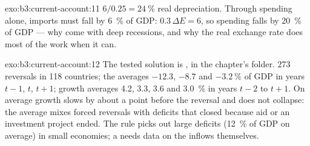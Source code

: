 \begin{solution}{exo:b3:current-account:11}
$6/0.25 = 24~\%$ real depreciation. Through spending alone, imports must fall by 6~\% of
GDP: $0.3\,\Delta E = 6$, so spending falls by 20~\% of GDP --- why  come
with deep recessions, and why the real exchange rate does most of the work when it
can.
\end{solution}

\begin{solution}{exo:b3:current-account:12}
The tested solution is , in the chapter's 
folder. 273 reversals in 118 countries; the  averages $-12.3$, $-8.7$
and $-3.2~\%$ of GDP in years $t - 1$, $t$, $t + 1$; growth averages 4.2, 3.3, 3.6 and
3.0~\% in years $t - 2$ to $t + 1$. %
On average growth slows by about a point before the reversal and does not
collapse: the average mixes forced reversals with deficits that closed because aid
or an investment project ended. The rule picks out large deficits (12~\% of GDP on
average) in small economies; a  needs data on the inflows themselves.
\end{solution}

